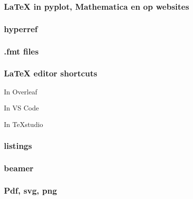 \documentclass{cursuspresentatie}
\def\importslide#1#2{%
    {#2}
}
\begin{document}
    \begin{frame}
        \frametitle{LaTeX in pyplot, Mathematica en op websites}
    \end{frame}

    \begin{frame}
        \frametitle{hyperref}
    \end{frame}

    \begin{frame}
        \frametitle{.fmt files}
    \end{frame}

    \begin{frame}
        \frametitle{LaTeX editor shortcuts}

        In Overleaf

        In VS Code

        In TeXstudio
    \end{frame}

    \begin{frame}
        \frametitle{listings}
    \end{frame}

    \begin{frame}
        \frametitle{beamer}
    \end{frame}

    \begin{frametitle}
        \frametitle{Pdf, svg, png}
    \end{frametitle}















    



\end{document}
